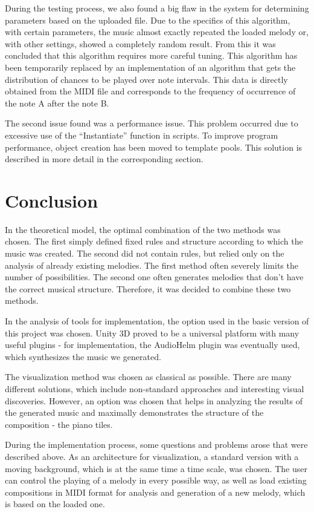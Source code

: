\documentclass[thesis=B,english]{FITthesis}[2019/12/23]
\begin{document}
During the testing process, we also found a big flaw in the system for determining parameters based on the uploaded file. Due to the specifics of this algorithm, with certain parameters, the music almost exactly repeated the loaded melody or, with other settings, showed a completely random result. From this it was concluded that this algorithm requires more careful tuning. This algorithm has been temporarily replaced by an implementation of an algorithm that gets the distribution of chances to be played over note intervals. This data is directly obtained from the MIDI file and corresponds to the frequency of occurrence of the note A after the note B.

The second issue found was a performance issue. This problem occurred due to excessive use of the “Instantiate” function in scripts. To improve program performance, object creation has been moved to template pools. This solution is described in more detail in the corresponding section.

\chapter{Conclusion}

In the theoretical model, the optimal combination of the two methods was chosen. The first simply defined fixed rules and structure according to which the music was created. The second did not contain rules, but relied only on the analysis of already existing melodies. The first method often severely limits the number of possibilities. The second one often generates melodies that don't have the correct musical structure. Therefore, it was decided to combine these two methods.

In the analysis of tools for implementation, the option used in the basic version of this project was chosen. Unity 3D proved to be a universal platform with many useful plugins - for implementation, the AudioHelm plugin was eventually used, which synthesizes the music we generated.

The visualization method was chosen as classical as possible. There are many different solutions, which include non-standard approaches and interesting visual discoveries. However, an option was chosen that helps in analyzing the results of the generated music and maximally demonstrates the structure of the composition - the piano tiles.

During the implementation process, some questions and problems arose that were described above. As an architecture for visualization, a standard version with a moving background, which is at the same time a time scale, was chosen. The user can control the playing of a melody in every possible way, as well as load existing compositions in MIDI format for analysis and generation of a new melody, which is based on the loaded one.
\end{document}
